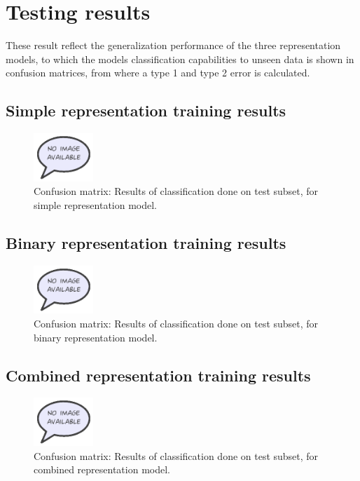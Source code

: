 \section{Testing results}
These result reflect the generalization performance of the three representation models, to which the models classification capabilities to unseen data is shown in confusion matrices, from where a type 1 and type 2 error is calculated. 
\subsection{Simple representation training results}
\begin{figure} [H]
\centering
\includegraphics[width=0.2\textwidth]{figures/missimage}
\caption{Confusion matrix: Results of classification done on test subset, for simple representation model.}
\label{fig:simpleConfusion}  
\end{figure}

\subsection{Binary representation training results}
\begin{figure} [H]
\centering
\includegraphics[width=0.2\textwidth]{figures/missimage}
\caption{Confusion matrix: Results of classification done on test subset, for binary representation model.}
\label{fig:binaryConfusion}  
\end{figure}

\subsection{Combined representation training results}
\begin{figure} [H]
\centering
\includegraphics[width=0.2\textwidth]{figures/missimage}
\caption{Confusion matrix: Results of classification done on test subset, for combined representation model.}
\label{fig:combinedConfusion}  
\end{figure}
